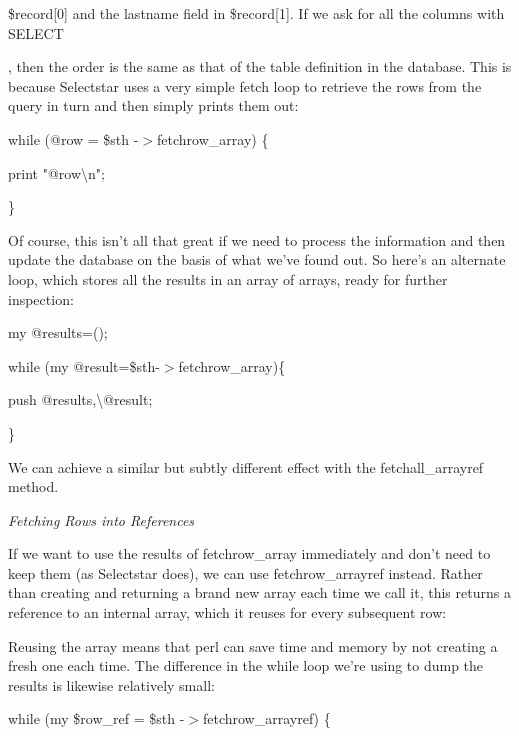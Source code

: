 \documentclass[a4paper,11pt]{book}
\begin{document}
\noindent \$record[0] and  the lastname field  in  \$record[1].  If we  ask for all  the  columns  with  SELECT

\noindent *,  then the order is the  same as  that  of the  table  definition  in  the database.  This  is  because Selectstar uses a very simple  fetch  loop  to  retrieve  the  rows from  the  query  in  turn and  then simply prints them out:

\noindent 

\noindent while (@row = \$sth -$>$fetchrow\_array) \{

\noindent print "@row\textbackslash n";

\noindent \}

\noindent 

\noindent Of course, this isn't all that great if we need to process the information and then update the database on the basis of what we've found out. So here's an alternate loop, which stores all the results in an array of arrays, ready for further inspection:

\noindent 

\noindent my @results=();

\noindent while (my @result=\$sth-$>$fetchrow\_array)\{

\noindent push @results,\textbackslash @result;

\noindent \}

\noindent 

\noindent We can achieve a similar but subtly different effect with the fetchall\_arrayref method.

\noindent 

\noindent 

\noindent \textit{Fetching Rows into References}

\noindent If we want to use the results of fetchrow\_array immediately and don't need to keep them (as Selectstar does), we can use fetchrow\_arrayref instead. Rather than creating and returning a brand new array each time we call it, this returns a reference to an internal array, which it reuses for every subsequent row:

\noindent 

\noindent Reusing the array means that perl can save time and memory by not creating a fresh one each time. The difference in the while loop we're using to dump the results is likewise relatively small:

\noindent 

\noindent while (my \$row\_ref = \$sth -$>$fetchrow\_arrayref) \{
\end{document}
